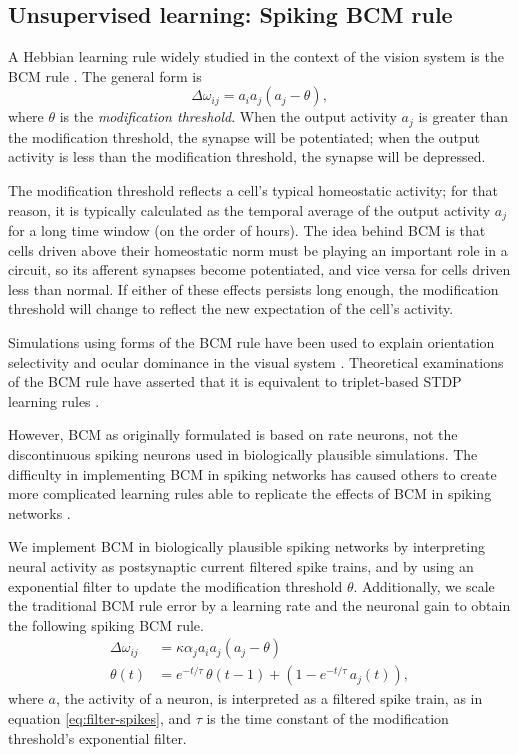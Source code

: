 \documentclass[10pt,letterpaper]{article}
\begin{document}
\subsection{Unsupervised learning: Spiking BCM rule}

A Hebbian learning rule widely studied
in the context of the vision system
is the BCM rule \cite{Bienenstock1982}.
The general form is
\begin{equation} \label{eq:bcm}
  \Delta \omega_{ij} = a_i a_j (a_j - \theta),
\end{equation}
where $\theta$ is the \textit{modification threshold}.
When the output activity $a_j$ is
greater than the modification threshold,
the synapse will be potentiated;
when the output activity is less than the modification threshold,
the synapse will be depressed.

The modification threshold reflects a cell's
typical homeostatic activity;
for that reason, it is typically calculated as
the temporal average of the output activity $a_j$
for a long time window (on the order of hours).
The idea behind BCM is that cells
driven above their homeostatic norm
must be playing an important role in a circuit,
so its afferent synapses become potentiated,
and vice versa for cells driven less than normal.
If either of these effects persists long enough,
the modification threshold will change
to reflect the new expectation
of the cell's activity.

Simulations using forms of the BCM rule
have been used to explain orientation selectivity
and ocular dominance in the visual system \cite{Bienenstock1982}.
Theoretical examinations of the BCM rule
have asserted that it is equivalent
to triplet-based STDP learning rules
\cite{Pfister2006}.

However, BCM as originally formulated
is based on rate neurons,
not the discontinuous spiking neurons
used in biologically plausible simulations.
The difficulty in implementing BCM in spiking networks
has caused others to create more complicated learning rules
able to replicate the effects of BCM in spiking networks
\cite{Pfister2006,Yger2012}.

We implement BCM in biologically plausible spiking networks
by interpreting neural activity as
postsynaptic current filtered spike trains,
and by using an exponential filter
to update the modification threshold $\theta$.
Additionally, we scale the traditional BCM rule error
by a learning rate and the neuronal gain
to obtain the following spiking BCM rule.
\begin{align} \label{eq:bcm}
  \Delta \omega_{ij} &= \kappa \alpha_j a_i a_j (a_j - \theta) \nonumber \\
  \theta(t) &= e^{-t / \tau} \, \theta(t-1) +
               (1 - e^{-t / \tau} \, a_j(t)),
\end{align}
where $a$, the activity of a neuron,
is interpreted as a filtered spike train,
as in equation \eqref{eq:filter-spikes},
and $\tau$ is
the time constant of
the modification threshold's exponential filter.
\end{document}
